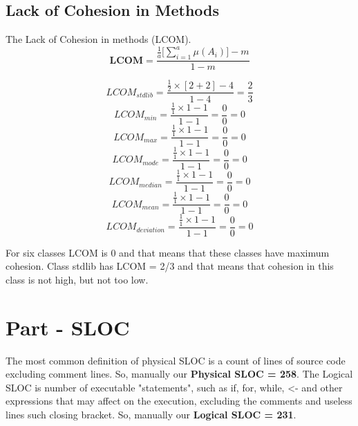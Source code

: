\documentclass[12pt]{article}
\begin{document}
\subsection{Lack of Cohesion in Methods}
The Lack of Cohesion in methods (LCOM).
\begin{equation}
    \textbf{LCOM} =\frac{\frac{1}{a}\Big[\sum^{a}_{i=1}{\mu(A_{i})\big]-m}}{1-m}
\end{equation}

\begin{equation}
    LCOM_{stdlib} =\frac{\frac{1}{2}\times[2+2]-4}{1-4} = \frac{2}{3}
\end{equation}
\begin{equation}
    LCOM_{min} = \frac{\frac{1}{1}\times1-1}{1-1} = \frac{0}{0} = 0
\end{equation}
\begin{equation}
    LCOM_{max} = \frac{\frac{1}{1}\times1-1}{1-1} = \frac{0}{0} = 0
\end{equation}
\begin{equation}
    LCOM_{mode} = \frac{\frac{1}{1}\times1-1}{1-1} = \frac{0}{0} = 0
\end{equation}
\begin{equation}
    LCOM_{median} = \frac{\frac{1}{1}\times1-1}{1-1} = \frac{0}{0} = 0
\end{equation}
\begin{equation}
    LCOM_{mean} = \frac{\frac{1}{1}\times1-1}{1-1} = \frac{0}{0} = 0
\end{equation}
\begin{equation}
    LCOM_{deviation} = \frac{\frac{1}{1}\times1-1}{1-1} = \frac{0}{0} = 0
\end{equation}

For six classes LCOM is 0 and that means that these classes have maximum cohesion. Class stdlib has LCOM = 2/3 and that means that cohesion in this class is not high, but not too low.
\section{Part - SLOC}
The most common definition of physical SLOC is a count of lines of source code excluding comment lines.
So, manually our \textbf{Physical SLOC = 258}. The Logical SLOC is number of executable "statements", such as if, for, while, <- and other expressions that may affect on the execution, excluding the comments and useless lines such closing bracket. So, manually our \textbf{Logical SLOC = 231}.\\
\end{document}
